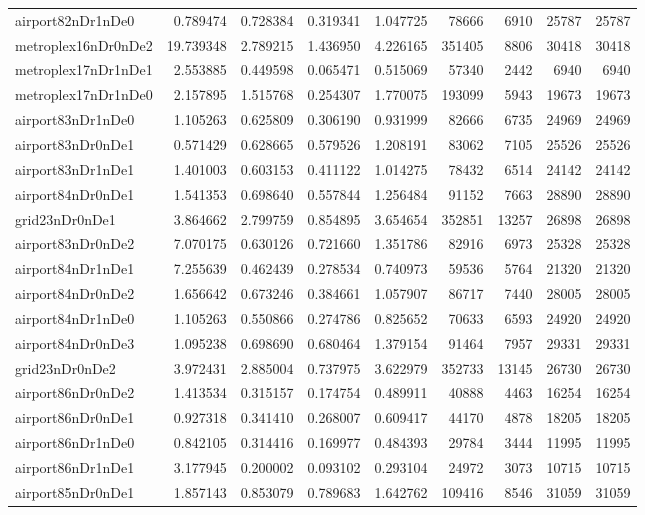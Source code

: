 \documentclass[../../../thesis.tex]{subfiles}
\begin{document}
\begin{longtable}{|l|r|r|r|r|r|r|r|r|}
airport82nDr1nDe0 & 0.789474 & 0.728384 & 0.319341 & 1.047725 & 78666 & 6910 & 25787 & 25787 \\
metroplex16nDr0nDe2 & 19.739348 & 2.789215 & 1.436950 & 4.226165 & 351405 & 8806 & 30418 & 30418 \\
metroplex17nDr1nDe1 & 2.553885 & 0.449598 & 0.065471 & 0.515069 & 57340 & 2442 & 6940 & 6940 \\
metroplex17nDr1nDe0 & 2.157895 & 1.515768 & 0.254307 & 1.770075 & 193099 & 5943 & 19673 & 19673 \\
airport83nDr1nDe0 & 1.105263 & 0.625809 & 0.306190 & 0.931999 & 82666 & 6735 & 24969 & 24969 \\
airport83nDr0nDe1 & 0.571429 & 0.628665 & 0.579526 & 1.208191 & 83062 & 7105 & 25526 & 25526 \\
airport83nDr1nDe1 & 1.401003 & 0.603153 & 0.411122 & 1.014275 & 78432 & 6514 & 24142 & 24142 \\
airport84nDr0nDe1 & 1.541353 & 0.698640 & 0.557844 & 1.256484 & 91152 & 7663 & 28890 & 28890 \\
grid23nDr0nDe1 & 3.864662 & 2.799759 & 0.854895 & 3.654654 & 352851 & 13257 & 26898 & 26898 \\
airport83nDr0nDe2 & 7.070175 & 0.630126 & 0.721660 & 1.351786 & 82916 & 6973 & 25328 & 25328 \\
airport84nDr1nDe1 & 7.255639 & 0.462439 & 0.278534 & 0.740973 & 59536 & 5764 & 21320 & 21320 \\
airport84nDr0nDe2 & 1.656642 & 0.673246 & 0.384661 & 1.057907 & 86717 & 7440 & 28005 & 28005 \\
airport84nDr1nDe0 & 1.105263 & 0.550866 & 0.274786 & 0.825652 & 70633 & 6593 & 24920 & 24920 \\
airport84nDr0nDe3 & 1.095238 & 0.698690 & 0.680464 & 1.379154 & 91464 & 7957 & 29331 & 29331 \\
grid23nDr0nDe2 & 3.972431 & 2.885004 & 0.737975 & 3.622979 & 352733 & 13145 & 26730 & 26730 \\
airport86nDr0nDe2 & 1.413534 & 0.315157 & 0.174754 & 0.489911 & 40888 & 4463 & 16254 & 16254 \\
airport86nDr0nDe1 & 0.927318 & 0.341410 & 0.268007 & 0.609417 & 44170 & 4878 & 18205 & 18205 \\
airport86nDr1nDe0 & 0.842105 & 0.314416 & 0.169977 & 0.484393 & 29784 & 3444 & 11995 & 11995 \\
airport86nDr1nDe1 & 3.177945 & 0.200002 & 0.093102 & 0.293104 & 24972 & 3073 & 10715 & 10715 \\
airport85nDr0nDe1 & 1.857143 & 0.853079 & 0.789683 & 1.642762 & 109416 & 8546 & 31059 & 31059 \\

\end{longtable}
\end{document}
